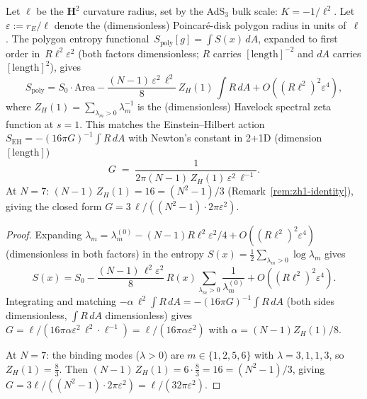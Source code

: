 \begin{proposition}
\label{prop:newton-havelock}
Let $\ell$ be the $\mathbf{H}^2$ curvature radius, set by the
AdS$_3$ bulk scale: $K = -1/\ell^2$.
Let $\varepsilon := r_E/\ell$ denote the (dimensionless)
Poincar\'e-disk polygon radius in units of~$\ell$.
The polygon entropy functional~$S_{\mathrm{poly}}[g] = \int S(x)\,dA$,
expanded to first order in~$R\ell^2\varepsilon^2$
(both factors dimensionless; $R$ carries $[\text{length}]^{-2}$
and $dA$ carries $[\text{length}]^2$), gives
\begin{equation}\label{eq:spoly-expansion}
  S_{\mathrm{poly}} = S_0 \cdot \mathrm{Area}
  - \frac{(N{-}1)\,\varepsilon^2\,\ell^2}{8}\,Z_H(1)\,\int R\,dA
  + O((R\ell^2)^2\varepsilon^4),
\end{equation}
where $Z_H(1) = \sum_{\lambda_m > 0} \lambda_m^{-1}$
is the (dimensionless) Havelock spectral zeta function at
$s = 1$.
This matches the Einstein--Hilbert action
$S_{\mathrm{EH}} = -(16\pi G)^{-1}\int R\,dA$
with Newton's constant in 2+1D
(dimension $[\text{length}]$)
\begin{equation}\label{eq:newton-from-spectrum}
  G \;=\; \frac{1}{2\pi(N{-}1)\,Z_H(1)\,\varepsilon^2\,\ell^{-1}}.
\end{equation}
At $N = 7$: $(N{-}1)\,Z_H(1) = 16 = (N^2{-}1)/3$
(Remark~\ref{rem:zh1-identity}), giving the closed form
$G = 3\,\ell/((N^2{-}1)\cdot 2\pi\varepsilon^2)$.
\end{proposition}

\begin{proof}
Expanding
$\lambda_m = \lambda_m^{(0)} - (N{-}1)R\ell^2\varepsilon^2/4 + O((R\ell^2)^2\varepsilon^4)$
(dimensionless in both factors) in the entropy
$S(x) = \tfrac{1}{2}\sum_{\lambda_m > 0}\log\lambda_m$ gives
\[
  S(x) = S_0
  - \frac{(N{-}1)\,\ell^2\varepsilon^2}{8}\,R(x)\sum_{\lambda_m > 0}\frac{1}{\lambda_m^{(0)}}
  + O((R\ell^2)^2\varepsilon^4).
\]
Integrating and matching
$-\alpha\,\ell^2\int R\,dA = -(16\pi G)^{-1}\int R\,dA$
(both sides dimensionless, $\int R\,dA$ dimensionless)
gives $G = \ell/(16\pi\alpha\varepsilon^2\,\ell^2\cdot\ell^{-1})
      = \ell/(16\pi\alpha\varepsilon^2)$
with $\alpha = (N{-}1)Z_H(1)/8$.

At $N = 7$: the binding modes ($\lambda > 0$) are
$m \in \{1,2,5,6\}$ with $\lambda = 3, 1, 1, 3$,
so $Z_H(1) = \tfrac{8}{3}$.
Then $(N{-}1)\,Z_H(1) = 6 \cdot \tfrac{8}{3} = 16 = (N^2{-}1)/3$,
giving $G = 3\ell/((N^2{-}1)\cdot 2\pi\varepsilon^2)
       = \ell/(32\pi\varepsilon^2)$.
\end{proof}

